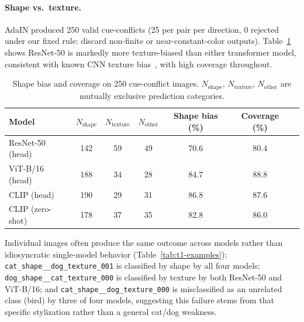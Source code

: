 \documentclass{article}
\begin{document}
\paragraph{Shape vs.\ texture.}
\label{sec:t1-shapetexture}
AdaIN produced 250 valid cue-conflicts (25 per pair per direction, 0 rejected under our fixed rule: discard non-finite or near-constant-color outputs). Table~\ref{tab:t1-shapebias} shows ResNet-50 is markedly more texture-biased than either transformer model, consistent with known CNN texture bias~\citep{geirhos2019imagenet}, with high coverage throughout.

\begin{table}[t]
  \caption{Shape bias and coverage on 250 cue-conflict images. $N_\text{shape}$, $N_\text{texture}$, $N_\text{other}$ are mutually exclusive prediction categories.}
  \label{tab:t1-shapebias}
  \centering
  \footnotesize
  \begin{tabular}{lcccccc}
    \toprule
    Model & $N_\text{shape}$ & $N_\text{texture}$ & $N_\text{other}$ & Shape bias (\%) & Coverage (\%) \\
    \midrule
    ResNet-50 (head) & 142 & 59 & 49 & 70.6 & 80.4 \\
    ViT-B/16 (head)  & 188 & 34 & 28 & 84.7 & 88.8 \\
    CLIP (head)      & 190 & 29 & 31 & 86.8 & 87.6 \\
    CLIP (zero-shot) & 178 & 37 & 35 & 82.8 & 86.0 \\
    \bottomrule
  \end{tabular}
\end{table}

Individual images often produce the same outcome across models rather than idiosyncratic single-model behavior (Table~\ref{tab:t1-examples}): \texttt{cat\_shape\_\_dog\_texture\_001} is classified by shape by all four models; \texttt{dog\_shape\_\_cat\_texture\_000} is classified by texture by both ResNet-50 and ViT-B/16; and \texttt{cat\_shape\_\_dog\_texture\_000} is misclassified as an unrelated class (bird) by three of four models, suggesting this failure stems from that specific stylization rather than a general cat/dog weakness.
\end{document}
